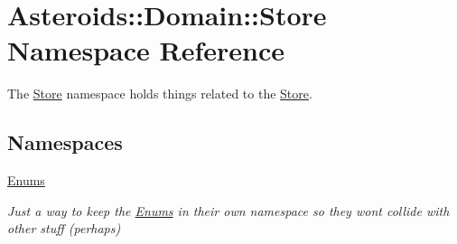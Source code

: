 \hypertarget{namespaceAsteroids_1_1Domain_1_1Store}{}\section{Asteroids\+:\+:Domain\+:\+:Store Namespace Reference}
\label{namespaceAsteroids_1_1Domain_1_1Store}


The \hyperlink{classAsteroids_1_1Domain_1_1Store_1_1Store}{Store} namespace holds things related to the \hyperlink{classAsteroids_1_1Domain_1_1Store_1_1Store}{Store}.  


\subsection*{Namespaces}
\begin{DoxyCompactItemize}
\item 
 \hyperlink{namespaceAsteroids_1_1Domain_1_1Store_1_1Enums}{Enums}
\begin{DoxyCompactList}\small\item\em Just a way to keep the \hyperlink{namespaceAsteroids_1_1Domain_1_1Store_1_1Enums}{Enums} in their own namespace so they won\textquotesingle{}t collide with other stuff (perhaps) \end{DoxyCompactList}\end{DoxyCompactItemize}
